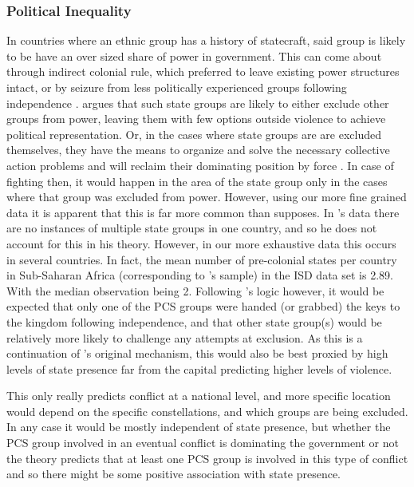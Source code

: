 \documentclass[12pt]{article}
\begin{document}

\subsubsection{Political Inequality}

In countries where an ethnic group has a history of statecraft, said group is
likely to be have an over sized share of power in government. This can come
about through indirect colonial rule, which preferred to leave existing power
structures intact, or by seizure from less politically experienced groups
following independence \citep{Paine2019}. \citet{Paine2019} argues that such
state groups are likely to either exclude other groups from power, leaving them
with few options outside violence to achieve political representation. Or, in
the cases where state groups are are excluded themselves, they have the means to
organize and solve the necessary collective action problems and will reclaim
their dominating position by force \citep{Paine2019}. In case of fighting then,
it would happen in the area of the state group only in the cases where that
group was excluded from power. However, using our more fine grained data it is
apparent that this is far more common than \citet{Paine2019} supposes. In
\citet{Paine2019}'s data there are no instances of multiple state groups in one
country, and so he does not account for this in his theory. However, in our more
exhaustive data this occurs in several countries. In fact, the mean number of
pre-colonial states per country in Sub-Saharan Africa (corresponding to
\citet{Paine2019}'s sample) in the ISD data set is 2.89. With the median
observation being 2. Following \citet{Paine2019}'s logic however, it would be
expected that only one of the PCS groups were handed (or grabbed) the keys to
the kingdom following independence, and that other state group(s) would be
relatively more likely to challenge any attempts at exclusion.  As this is a
continuation of \citet{Paine2019}'s original mechanism, this would also be best
proxied by high levels of state presence far from the capital predicting higher
levels of violence.

This only really predicts conflict at a national level, and more specific
location would depend on the specific constellations, and which groups are being
excluded. In any case  it would be mostly independent of state presence, but
whether the PCS group involved in an eventual conflict is dominating the
government or not the theory predicts that at least one PCS group is involved in
this type of conflict and so there might be some positive association with
state presence.
\end{document}
